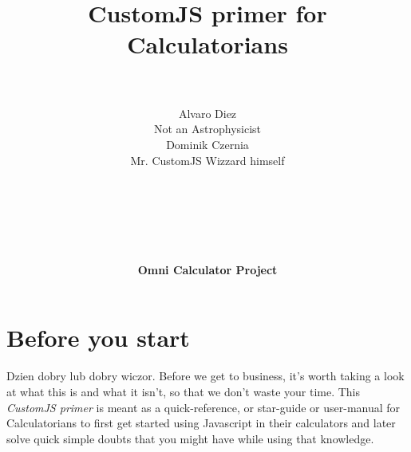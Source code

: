 \documentclass[11pt,a4paper,oldfontcommands]{memoir}
\begin{document}
%
%
\thispagestyle{empty}

{%

\centering
\title{ \normalsize \textsc{}
		\\ [2.0cm]
		\hline \vspace{10pt} \\
		\huge \textbf{CustomJS primer for Calculatorians\textsuperscript{\textregistered}} \vspace{5pt}
		\textbf{\hline}{\hline} \\ [0.5cm]
		\large \vspace{200pt}\\}		}
		


\author{\LARGE Alvaro Diez \\
		Not an Astrophysicist\texttrademark \\
		\LARGE Dominik Czernia \\
		Mr. CustomJS Wizzard himself \\ \\ \\ \\ \\ \\ \\
		\LARGE {\textbf{Omni Calculator Project}} \vspace{-50pt}
} 
		
\maketitle
\noalign
\clearpage

\tableofcontents

\clearpage


\chapter{Before you start}

Dzien dobry lub dobry wiczor. Before we get to business, it's worth taking a look at what this  is and what it isn't, so that we don't waste your time.
This \textit{CustomJS primer} is meant as a quick-reference, or star-guide or user-manual for Calculatorians to first get started using Javascript in their calculators and later solve quick simple doubts that you might have while using that knowledge.
\end{document}
